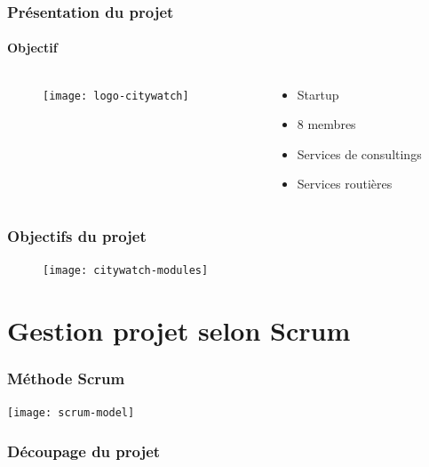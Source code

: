 \documentclass{beamer}
\begin{document}
\begin{frame}
    \frametitle{Présentation du projet}
    \framesubtitle{Objectif}
    \begin{columns}
        \begin{column}{0.5\textwidth}
            \begin{figure}
                \texttt{[image: logo-citywatch]}
            \end{figure}
        \end{column}
        \begin{column}{0.5\textwidth}
            \begin{itemize}
                \item Startup
                \item 8 membres
                \item Services de consultings
                \item Services routières
            \end{itemize}
        \end{column}
    \end{columns}
\end{frame}

\begin{frame}
    \frametitle{Objectifs du projet}
    \begin{figure}
        \centering
        \texttt{[image: citywatch-modules]}
    \end{figure}
\end{frame}

\section{Gestion projet selon Scrum}


\begin{frame}
    \frametitle{Méthode Scrum}
    \centering
    \texttt{[image: scrum-model]}
\end{frame}

\begin{frame}
\frametitle{Découpage du projet}
\begin{figure}
\end{figure}
\end{frame}
\end{document}

